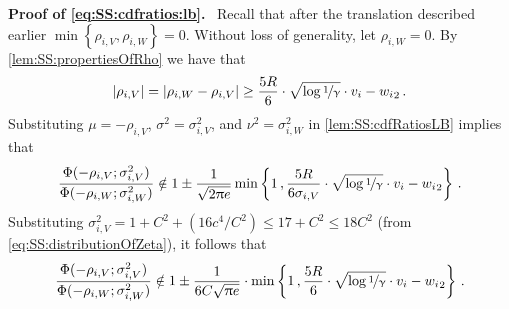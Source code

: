 \documentclass[11pt,letterpaper]{article}
\theoremstyle{plain}
\theoremstyle{definition}
\theoremstyle{remark}
\def\abs#1{\left| #1 \right|}
\newcommand{\sinparen}[1]{\ensuremath{(#1)}}
\newcommand{\inbrace}[1]{\ensuremath{\left\{#1\right\}}}
\let\norm\relax
\newcommand{\norm}[1]{\ensuremath{\left\lVert #1 \right\rVert}}
\newcommand{\nfrac}[2]{\nicefrac{#1}{#2}}
\renewcommand{\paragraph}[1]{\medskip \noindent\textbf{#1}~}
\renewcommand{\gamma}{\upgamma}
\renewcommand{\pi}{\uppi}
\newcommand{\customcdf}[2]{\Phi\sinparen{#1; \sigma_{#2}^2}}
\begin{document}
{{{            \paragraph{Proof of \cref{eq:SS:cdfratios:lb}.}
            Recall that after the translation described earlier $\min\inbrace{\rho_{i,V}, \rho_{i,W}}=0$.
            Without loss of generality, let $\rho_{i, W}=0$.
            By \cref{lem:SS:propertiesOfRho} we have that 
            \[
                \abs{\rho_{i, V}} = \abs{\rho_{i, W} - \rho_{i, V}}\geq \frac{5R}{6} \cdot \sqrt{\log{\nfrac{1}{\gamma}}}\cdot \norm{v_i - w_i}_2\,.
            \]
            Substituting $\mu=-\rho_{i,V}$, $\sigma^2=\sigma_{i,V}^2$, and $\nu^2=\sigma_{i,W}^2$ in \cref{lem:SS:cdfRatiosLB} implies that 
            \[
                \frac{
                    \customcdf{-\rho_{i,V}}{i,V}
                }{
                    \customcdf{-\rho_{i,W}}{i,W}
                }
                \notin 1 \pm \frac{1}{\sqrt{2\pi e}}
                    \min\inbrace{
                        1\,, 
                        \frac{5R}{6\sigma_{i,V}} \cdot \sqrt{\log{\nfrac{1}{\gamma}}}\cdot \norm{v_i - w_i}_2
                    }
                \,.
            \]
            Substituting $\sigma_{i,V}^2=1+C^2+(16c^4/C^2)\leq 17+C^2\leq 18C^2$ (from \cref{eq:SS:distributionOfZeta}), it follows that 
            \[
                \frac{
                    \customcdf{-\rho_{i,V}}{i,V}
                }{
                    \customcdf{-\rho_{i,W}}{i,W}
                }
                \notin 1 \pm \frac{1}{6C\sqrt{\pi e}}\cdot 
                    \min\inbrace{
                        1\,,
                        \frac{5R}{6}\cdot \sqrt{\log{\nfrac{1}{\gamma}}}\cdot \norm{v_i-w_i}_2 
                    }
                \,.
            \]

}}}
\end{document}

